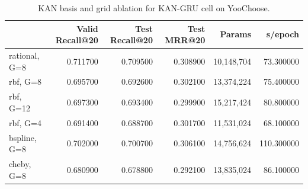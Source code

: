 \begin{table}[H]
\centering\small
\caption{KAN basis and grid ablation for KAN-GRU cell on YooChoose.}
\label{tab:ablation}
\begin{tabular}{lrrrrr}
\toprule
 & Valid Recall@20 & Test Recall@20 & Test MRR@20 & Params & s/epoch \\
\midrule
rational, G=8 & 0.711700 & 0.709500 & 0.308900 & 10,148,704 & 73.300000 \\
rbf, G=8 & 0.695700 & 0.692600 & 0.302100 & 13,374,224 & 75.400000 \\
rbf, G=12 & 0.697300 & 0.693400 & 0.299900 & 15,217,424 & 80.800000 \\
rbf, G=4 & 0.691400 & 0.688700 & 0.301700 & 11,531,024 & 68.100000 \\
bspline, G=8 & 0.702000 & 0.700700 & 0.306100 & 14,756,624 & 110.300000 \\
cheby, G=8 & 0.680900 & 0.678800 & 0.292100 & 13,835,024 & 86.100000 \\
\bottomrule
\end{tabular}
\end{table}
